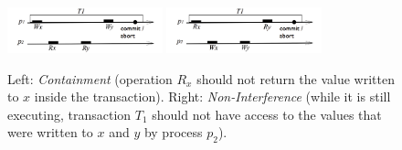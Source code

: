 \begin{figure}[ht]
\centerline{
     \mbox{\includegraphics[width=0.4\textwidth]{SI/imgs/non_containment}}     
    \mbox{\includegraphics[width=0.4\textwidth]{SI/imgs/interference}}
}
\caption{Left:  {\it Containment}  (operation $R_x$  should not  return the
    value written to $x$ inside the transaction). 
Right:  {\it  Non-Interference} (while  it is still  executing, transaction
$T_1$ should not have access to the values that were written to $x$ and $y$
by process $p_2$).} 
\label{fig:int-nonc}
\end{figure}




 

